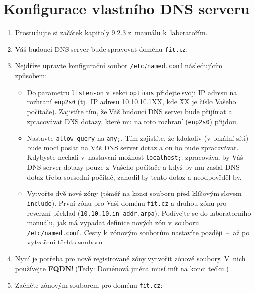\section{Konfigurace vlastního DNS serveru}
\begin{enumerate}
  \item Prostudujte si začátek kapitoly 9.2.3 z~manuálu k~laboratořím.
  \item Váš budoucí DNS server bude spravovat doménu  {\tt fit.cz}.
  \item Nejdříve upravte konfigurační soubor {\tt /etc/named.conf} následujícím způsobem:
    \begin{itemize}
      \item Do parametru {\tt listen-on} v~sekci {\tt options} přidejte svoji IP adresu na rozhraní {\tt enp2s0}
            (tj.~IP adresu 10.10.10.1XX, kde XX je číslo Vašeho počítače).
            Zajistíte tím, že Váš budoucí DNS server bude přijímat a zpracovávat DNS dotazy, které mu na toto rozhraní ({\tt enp2s0}) přijdou. 
      \item Nastavte {\tt allow-query} na {\tt any;}.
            Tím zajistíte, že kdokoliv (v~lokální síti) bude moci poslat na Váš DNS server dotaz a on ho bude zpracovávat.
            Kdybyste nechali v~nastavení možnost {\tt localhost;}, zpracovával by Váš DNS server dotazy pouze z~Vašeho počítače a
            když by mu zaslal DNS dotaz třeba sousední počítač, zahodil by tento dotaz a neodpověděl by.
      \item Vytvořte dvě nové zóny (téměř na konci souboru před klíčovým slovem {\tt include}). První zónu pro Vaši doménu {\tt fit.cz} a druhou zónu pro reverzní překlad ({\tt 10.10.10.in-addr.arpa}).
            Podívejte se do laboratorního manuálu, jak má vypadat definice nových zón v~souboru {\tt /etc/named.conf}.
            Cesty k~zónovým souborům nastavíte později~--~až po vytvoření těchto souborů.
    \end{itemize}
  
  \item Nyní je potřeba pro nově registrované zóny vytvořit zónové soubory. V~nich používejte \textbf{FQDN}! (Tedy: Doménová jména musí mít na konci tečku.)
  \item Začněte zónovým souborem pro doménu {\tt fit.cz}:
  

\end{enumerate}
